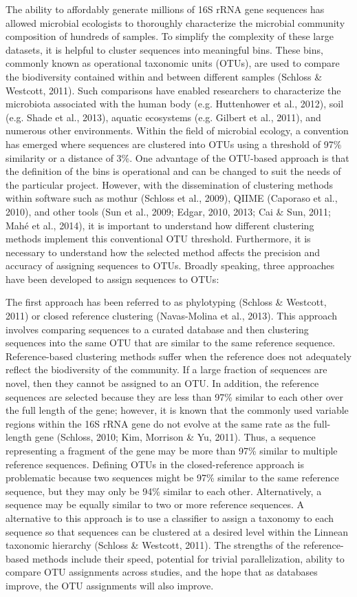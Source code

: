 \documentclass[11pt,]{article}
\begin{document}
The ability to affordably generate millions of 16S rRNA gene sequences
has allowed microbial ecologists to thoroughly characterize the
microbial community composition of hundreds of samples. To simplify the
complexity of these large datasets, it is helpful to cluster sequences
into meaningful bins. These bins, commonly known as operational
taxonomic units (OTUs), are used to compare the biodiversity contained
within and between different samples (Schloss \& Westcott, 2011). Such
comparisons have enabled researchers to characterize the microbiota
associated with the human body (e.g. Huttenhower et al., 2012), soil
(e.g. Shade et al., 2013), aquatic ecosystems (e.g. Gilbert et al.,
2011), and numerous other environments. Within the field of microbial
ecology, a convention has emerged where sequences are clustered into
OTUs using a threshold of 97\% similarity or a distance of 3\%. One
advantage of the OTU-based approach is that the definition of the bins
is operational and can be changed to suit the needs of the particular
project. However, with the dissemination of clustering methods within
software such as mothur (Schloss et al., 2009), QIIME (Caporaso et al.,
2010), and other tools (Sun et al., 2009; Edgar, 2010, 2013; Cai \& Sun,
2011; Mahé et al., 2014), it is important to understand how different
clustering methods implement this conventional OTU threshold.
Furthermore, it is necessary to understand how the selected method
affects the precision and accuracy of assigning sequences to OTUs.
Broadly speaking, three approaches have been developed to assign
sequences to OTUs:

The first approach has been referred to as phylotyping (Schloss \&
Westcott, 2011) or closed reference clustering (Navas-Molina et al.,
2013). This approach involves comparing sequences to a curated database
and then clustering sequences into the same OTU that are similar to the
same reference sequence. Reference-based clustering methods suffer when
the reference does not adequately reflect the biodiversity of the
community. If a large fraction of sequences are novel, then they cannot
be assigned to an OTU. In addition, the reference sequences are selected
because they are less than 97\% similar to each other over the full
length of the gene; however, it is known that the commonly used variable
regions within the 16S rRNA gene do not evolve at the same rate as the
full-length gene (Schloss, 2010; Kim, Morrison \& Yu, 2011). Thus, a
sequence representing a fragment of the gene may be more than 97\%
similar to multiple reference sequences. Defining OTUs in the
closed-reference approach is problematic because two sequences might be
97\% similar to the same reference sequence, but they may only be 94\%
similar to each other. Alternatively, a sequence may be equally similar
to two or more reference sequences. A alternative to this approach is to
use a classifier to assign a taxonomy to each sequence so that sequences
can be clustered at a desired level within the Linnean taxonomic
hierarchy (Schloss \& Westcott, 2011). The strengths of the
reference-based methods include their speed, potential for trivial
parallelization, ability to compare OTU assignments across studies, and
the hope that as databases improve, the OTU assignments will also
improve.
\end{document}
